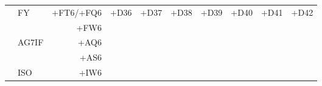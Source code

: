 \begin{center}
{\begin{tabular}{|c|lr|c|c|c|c|c|c|c|}
\hline
    \multirow{5}{0.5in}{} & FY    & +FT6/+FQ6 & \multirow[t]{5}{1in}{+D36} & \multirow[t]{5}{1in}{+D37} & \multirow[t]{5}{1in}{+D38} & \multirow[t]{5}{1in}{+D39} & \multirow[t]{5}{1in}{+D40} & \multirow[t]{5}{1in}{+D41} & \multirow[t]{5}{1in}{+D42} \\
                        &       &      +FW6 &                            &                            &                            &                            &                            &                            &                            \\
                        & AG7IF &      +AQ6 &                            &                            &                            &                            &                            &                            &                            \\
                        &       &      +AS6 &                            &                            &                            &                            &                            &                            &                            \\
                        & ISO   &      +IW6 &                            &                            &                            &                            &                            &                            &                            \\
\hline
\end{tabular}
}
\end{center}

